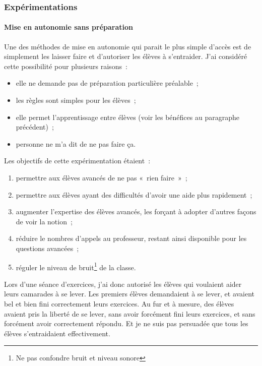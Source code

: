 \subsubsection{Expérimentations}

\paragraph{Mise en autonomie sans préparation}

Une des méthodes de mise en autonomie qui parait le plus simple d'accès est de
simplement les laisser faire et d'autoriser les élèves à s'entraider. J'ai
considéré cette possibilité pour plusieurs raisons :
\begin{itemize}
    \item elle ne demande pas de préparation particulière préalable ;
    \item les règles sont simples pour les élèves ;
    \item elle permet l'apprentissage entre élèves (voir les bénéfices au paragraphe précédent) ;
    \item personne ne m'a dit de ne pas faire ça.
\end{itemize}

Les objectifs de cette expérimentation étaient :
\begin{enumerate}
    \item permettre aux élèves avancés de ne pas « rien faire » ;
    \item permettre aux élèves ayant des difficultés d'avoir une aide plus
    rapidement ;
    \item augmenter l'expertise des élèves avancés, les forçant à adopter d'autres
    façons de voir la notion ;
    \item réduire le nombres d'appels au professeur, restant ainsi disponible
    pour les questions avancées ;
    \item réguler le niveau de bruit\footnote{Ne pas confondre bruit et niveau sonore} de la classe.
\end{enumerate}

Lors d'une séance d'exercices, j'ai donc autorisé les élèves qui voulaient
aider leurs camarades à se lever. Les premiers élèves demandaient à se lever, et
avaient bel et bien fini correctement leurs exercices. Au fur et à mesure, des
élèves avaient pris la liberté de se lever, sans avoir forcément fini leurs exercices,
et sans forcément avoir correctement répondu. Et je ne suis pas persuadée que
tous les élèves s'entraidaient effectivement.

